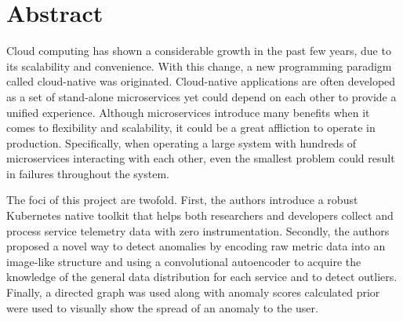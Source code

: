 \chapter*{Abstract}

Cloud computing has shown a considerable growth in the past few years, due to its scalability and convenience. With this change, a new programming paradigm called cloud-native was originated. Cloud-native applications are often developed as a set of stand-alone microservices yet could depend on each other to provide a unified experience. Although microservices introduce many benefits when it comes to flexibility and scalability, it could be a great affliction to operate in production. Specifically, when operating a large system with hundreds of microservices interacting with each other, even the smallest problem could result in failures throughout the system.



The foci of this project are twofold. First, the authors introduce a robust Kubernetes native toolkit that helps both researchers and developers collect and process service telemetry data with zero instrumentation. Secondly, the authors proposed a novel way to detect anomalies by encoding raw metric data into an image-like structure and using a convolutional autoencoder to acquire the knowledge of the general data distribution for each service and to detect outliers. Finally, a directed graph was used along with anomaly scores calculated prior were used to visually show the spread of an anomaly to the user. 

